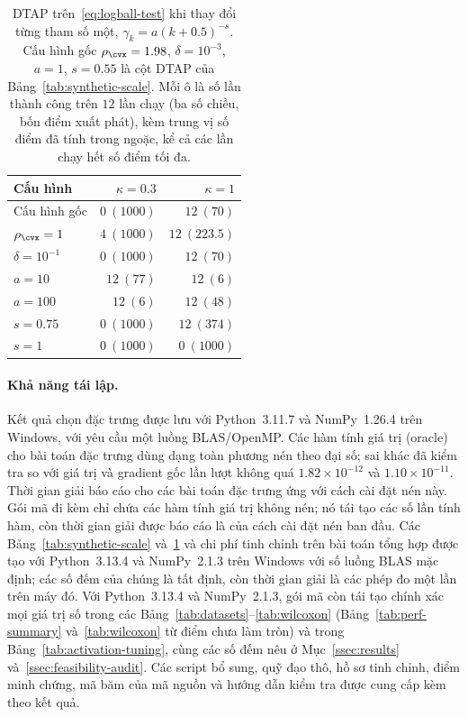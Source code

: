 \begin{table}[t]
\centering\small
\setlength{\tabcolsep}{5pt}
\caption{DTAP trên~\eqref{eq:logball-test} khi thay đổi từng tham số một,
$\gamma_k=a(k+0.5)^{-s}$. Cấu hình gốc $\rho_{\cvx}=1.98$, $\delta=10^{-3}$, $a=1$,
$s=0.55$ là cột DTAP của Bảng~\ref{tab:synthetic-scale}. Mỗi ô là
số lần thành công trên $12$ lần chạy (ba số chiều, bốn điểm xuất phát), kèm
trung vị số điểm đã tính trong ngoặc, kể cả các lần chạy hết số điểm tối đa.}
\label{tab:dtap-sweep}
\begin{tabular}{@{}lrr@{}}
\toprule
Cấu hình & $\kappa=0.3$ & $\kappa=1$\\
\midrule
Cấu hình gốc & $0\ (1000)$ & $12\ (70)$\\
$\rho_{\cvx}=1$ & $4\ (1000)$ & $12\ (223.5)$\\
$\delta=10^{-1}$ & $0\ (1000)$ & $12\ (70)$\\
$a=10$ & $12\ (77)$ & $12\ (6)$\\
$a=100$ & $12\ (6)$ & $12\ (48)$\\
$s=0.75$ & $0\ (1000)$ & $12\ (374)$\\
$s=1$ & $0\ (1000)$ & $0\ (1000)$\\
\bottomrule
\end{tabular}
\end{table}

\paragraph*{Khả năng tái lập.}
Kết quả chọn đặc trưng được lưu với Python~3.11.7 và NumPy~1.26.4
trên Windows, với yêu cầu một luồng BLAS/OpenMP. Các hàm tính giá trị (oracle) cho bài toán đặc trưng dùng dạng toàn phương
nén theo đại số; sai khác đã kiểm tra so với giá trị và gradient
gốc lần lượt không quá $1.82\times10^{-12}$ và
$1.10\times10^{-11}$. Thời gian giải báo cáo cho các bài toán đặc trưng ứng
với cách cài đặt nén này. Gói mã đi kèm chỉ chứa các hàm tính giá trị không nén;
nó tái tạo các số lần tính hàm, còn thời gian giải được báo cáo là của
cách cài đặt nén ban đầu. Các Bảng~\ref{tab:synthetic-scale}
và~\ref{tab:dtap-sweep} và chi phí tinh chỉnh trên bài toán tổng hợp được tạo với
Python~3.13.4 và NumPy~2.1.3 trên Windows với số luồng BLAS
mặc định; các số đếm của chúng là tất định, còn thời gian giải là các
phép đo một lần trên máy đó. Với Python~3.13.4 và NumPy~2.1.3, gói mã còn
tái tạo chính xác mọi giá trị số trong các Bảng~\ref{tab:datasets}--\ref{tab:wilcoxon}
(Bảng~\ref{tab:perf-summary} và~\ref{tab:wilcoxon} từ điểm chưa làm tròn) và trong
Bảng~\ref{tab:activation-tuning}, cùng các số đếm nêu ở Mục~\ref{ssec:results}
và~\ref{ssec:feasibility-audit}.
Các script bổ sung, quỹ đạo thô, hồ sơ tinh chỉnh, điểm minh chứng,
mã băm của mã nguồn và hướng dẫn kiểm tra được cung cấp kèm theo kết quả.

